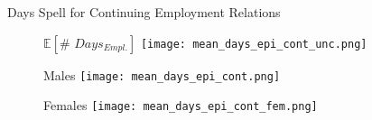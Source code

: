 \documentclass{beamer}
\begin{document}

\begin{frame}{Days Spell for Continuing Employment Relations}
\begin{figure}[!t]
\centering
\begin{minipage}[b]{0.3\textwidth}{$\mathbb{E}[\# \,\, Days_{Empl.}]$}
\centering
\texttt{[image: mean\_days\_epi\_cont\_unc.png]}
\end{minipage}
\begin{minipage}[b]{0.3\textwidth}{Males}
\centering
\texttt{[image: mean\_days\_epi\_cont.png]}
\end{minipage}
\begin{minipage}[b]{0.3\textwidth}{Females}
\centering
\texttt{[image: mean\_days\_epi\_cont\_fem.png]}
\end{minipage}
\end{figure}
\end{frame}
\end{document}
